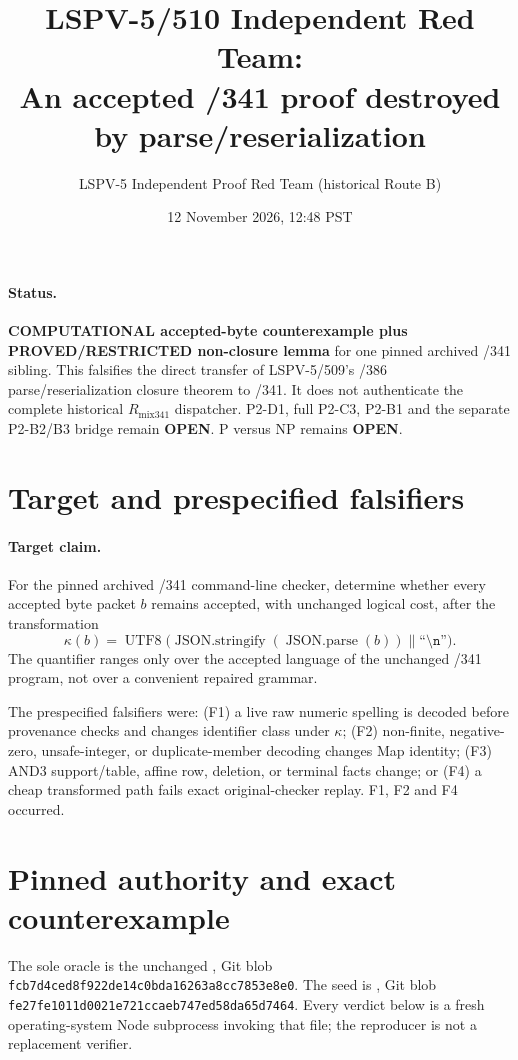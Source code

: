 \documentclass[11pt]{article}
\title{LSPV-5/510 Independent Red Team:\\
An accepted /341 proof destroyed by parse/reserialization}
\author{LSPV-5 Independent Proof Red Team (historical Route B)}
\date{12 November 2026, 12:48 PST}
\newcommand{\OPEN}{\textbf{OPEN}}
\begin{document}
\maketitle

\paragraph{Status.}
\textbf{COMPUTATIONAL accepted-byte counterexample plus
PROVED/RESTRICTED non-closure lemma} for one pinned archived /341 sibling.
This falsifies the direct transfer of LSPV-5/509's /386 parse/reserialization
closure theorem to /341.  It does not authenticate the complete historical
$R_{\mathrm{mix341}}$ dispatcher.  P2-D1, full P2-C3, P2-B1 and the separate
P2-B2/B3 bridge remain \OPEN.  P versus NP remains \OPEN.

\section{Target and prespecified falsifiers}
\paragraph{Target claim.}
For the pinned archived /341 command-line checker, determine whether every
accepted byte packet $b$ remains accepted, with unchanged logical cost, after
the transformation
\[
 \kappa(b)=\operatorname{UTF8}\bigl(
   \operatorname{JSON.stringify}(\operatorname{JSON.parse}(b))
   \mathbin{\|}\texttt{``\textbackslash n''}\bigr).
\]
The quantifier ranges only over the accepted language of the unchanged /341
program, not over a convenient repaired grammar.

The prespecified falsifiers were: (F1) a live raw numeric spelling is decoded
before provenance checks and changes identifier class under $\kappa$; (F2)
non-finite, negative-zero, unsafe-integer, or duplicate-member decoding changes
Map identity; (F3) AND3 support/table, affine row, deletion, or terminal facts
change; or (F4) a cheap transformed path fails exact original-checker replay.
F1, F2 and F4 occurred.

\section{Pinned authority and exact counterexample}
The sole oracle is the unchanged
, Git blob
\texttt{fcb7d4ced8f922de14c0bda16263a8cc7853e8e0}.  The seed is
,
Git blob \texttt{fe27fe1011d0021e721ccaeb747ed58da65d7464}.
Every verdict below is a fresh operating-system Node subprocess invoking that
file; the reproducer is not a replacement verifier.
\end{document}
